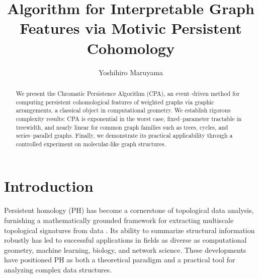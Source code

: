 \documentclass[runningheads]{llncs}
\title{Algorithm for Interpretable Graph Features via Motivic Persistent Cohomology
}
\author{Yoshihiro Maruyama}
\institute{School of Informatics, Nagoya University, Japan\\
\email{maruyama@i.nagoya-u.ac.jp}}
\begin{document}
\maketitle

\begin{abstract}
We present the Chromatic Persistence Algorithm (CPA), an event–driven method for computing persistent cohomological features of weighted graphs via graphic arrangements, a classical object in computational geometry. We establish rigorous complexity results: CPA is exponential in the worst case, fixed–parameter tractable in treewidth, and nearly linear for common graph families such as trees, cycles, and series–parallel graphs. Finally, we demonstrate its practical applicability through a controlled experiment on molecular-like graph structures.
\end{abstract}















\section{Introduction}
\label{sec:intro}

Persistent homology (PH) has become a cornerstone of topological data analysis, 
furnishing a mathematically grounded framework for extracting multiscale topological 
signatures from data \cite{EdelsbrunnerHarer2010,Ghrist2008,ZomorodianCarlsson2005,CohenSteinerHarer2007}. 
Its ability to summarize structural information robustly has led to successful 
applications in fields as diverse as computational geometry, machine learning, 
biology, and network science. These developments have positioned PH as both a 
theoretical paradigm and a practical tool for analyzing complex data structures. 
\end{document}
